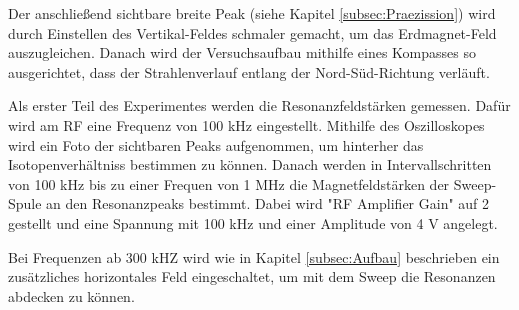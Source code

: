 Der anschließend sichtbare breite Peak (siehe Kapitel \ref{subsec:Praezission}) wird
durch Einstellen des Vertikal-Feldes schmaler gemacht, um das Erdmagnet-Feld
auszugleichen. Danach wird der
Versuchsaufbau mithilfe eines Kompasses so ausgerichtet, dass der Strahlenverlauf
entlang der Nord-Süd-Richtung verläuft.

Als erster Teil des Experimentes werden die Resonanzfeldstärken gemessen.
Dafür wird am RF eine Frequenz von 100 kHz eingestellt. Mithilfe des Oszilloskopes
wird ein Foto der sichtbaren Peaks aufgenommen, um hinterher das Isotopenverhältniss
bestimmen zu können. Danach werden in Intervallschritten von 100 kHz bis zu einer
Frequen von 1 MHz die Magnetfeldstärken der Sweep-Spule an den Resonanzpeaks bestimmt.
Dabei wird "RF Amplifier Gain" auf 2 gestellt und eine Spannung mit 100 kHz und einer
Amplitude von 4 V angelegt.

Bei Frequenzen ab 300 kHZ wird wie in Kapitel \ref{subsec:Aufbau} beschrieben
ein zusätzliches horizontales Feld eingeschaltet, um mit dem Sweep die Resonanzen
abdecken zu können.
